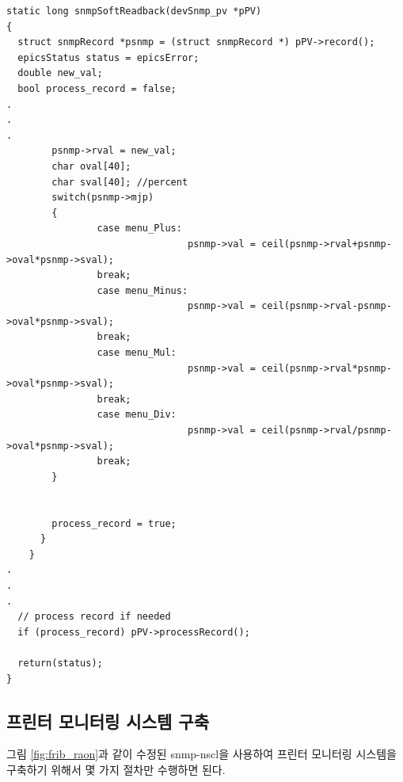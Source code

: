 \documentclass[11pt
  , a4paper
  , article
  , oneside
]{memoir}
\begin{document}
\begin{enumerate}
\begin{lstlisting}[style=termstylenumber]
static long snmpSoftReadback(devSnmp_pv *pPV)
{
  struct snmpRecord *psnmp = (struct snmpRecord *) pPV->record();
  epicsStatus status = epicsError;
  double new_val;
  bool process_record = false;
.
.
.
        psnmp->rval = new_val;
        char oval[40]; 
        char sval[40]; //percent
        switch(psnmp->mjp)
        {
                case menu_Plus: 
                                psnmp->val = ceil(psnmp->rval+psnmp->oval*psnmp->sval);
                break;
                case menu_Minus: 
                                psnmp->val = ceil(psnmp->rval-psnmp->oval*psnmp->sval);
                break;
                case menu_Mul: 
                                psnmp->val = ceil(psnmp->rval*psnmp->oval*psnmp->sval);
                break;
                case menu_Div: 
                                psnmp->val = ceil(psnmp->rval/psnmp->oval*psnmp->sval);
                break;
        }


        process_record = true;
      }
    }
.
.
.
  // process record if needed
  if (process_record) pPV->processRecord();

  return(status);
}
\end{lstlisting}
\end{enumerate}

\subsection{프린터 모니터링 시스템 구축}
그림 \ref{fig:frib_raon}과 같이 수정된 snmp-nscl을 사용하여 프린터 모니터링 시스템을 구축하기 위해서 몇 가지 절차만 수행하면 된다. 
\end{document}
